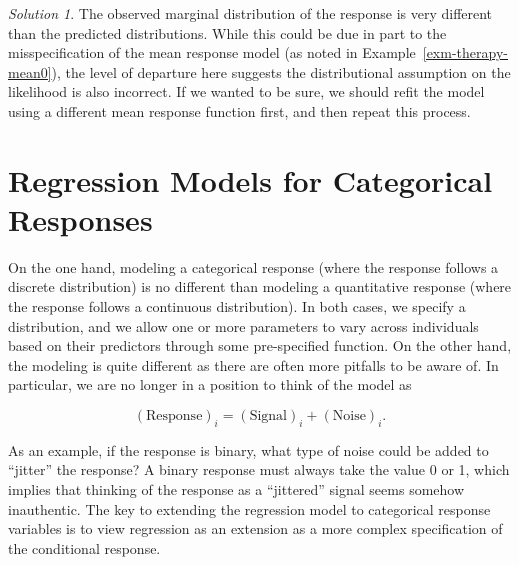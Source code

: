 \documentclass[
  letterpaper,
  DIV=11,
  numbers=noendperiod]{scrreprt}
\theoremstyle{definition}
\theoremstyle{definition}
\theoremstyle{plain}
\theoremstyle{remark}
\newtheorem*{solution}{Solution}
\begin{document}
\begin{solution}

The observed marginal distribution of the response is very different
than the predicted distributions. While this could be due in part to the
misspecification of the mean response model (as noted in
Example~\ref{exm-therapy-mean0}), the level of departure here suggests
the distributional assumption on the likelihood is also incorrect. If we
wanted to be sure, we should refit the model using a different mean
response function first, and then repeat this process.

\end{solution}

\hypertarget{sec-discrete-responses}{%
\chapter{Regression Models for Categorical
Responses}\label{sec-discrete-responses}}

\providecommand{\norm}[1]{\lVert#1\rVert}
\providecommand{\abs}[1]{\lvert#1\rvert}
\providecommand{\iid}{\stackrel{\text{IID}}{\sim}}
\providecommand{\ind}{\stackrel{\text{Ind}}{\sim}}

\providecommand{\bm}[1]{\mathbf{#1}}
\providecommand{\bs}[1]{\boldsymbol{#1}}
\providecommand{\bbeta}{\bs{\beta}}

\providecommand{\Ell}{\mathcal{L}}
\providecommand{\indep}{\perp\negthickspace\negmedspace\perp}

On the one hand, modeling a categorical response (where the response
follows a discrete distribution) is no different than modeling a
quantitative response (where the response follows a continuous
distribution). In both cases, we specify a distribution, and we allow
one or more parameters to vary across individuals based on their
predictors through some pre-specified function. On the other hand, the
modeling is quite different as there are often more pitfalls to be aware
of. In particular, we are no longer in a position to think of the model
as

\[(\text{Response})_i = (\text{Signal})_i + (\text{Noise})_i.\]

As an example, if the response is binary, what type of noise could be
added to ``jitter'' the response? A binary response must always take the
value 0 or 1, which implies that thinking of the response as a
``jittered'' signal seems somehow inauthentic. The key to extending the
regression model to categorical response variables is to view regression
as an extension as a more complex specification of the conditional
response.
\end{document}
